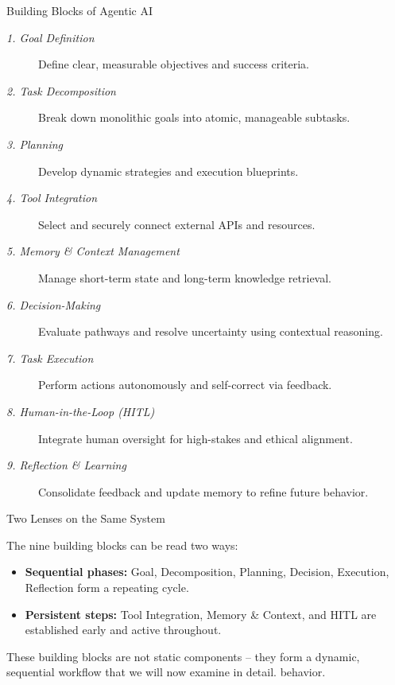 \documentclass[
11pt,notheorems,hyperref={pdfauthor=whatever}
]{beamer}
\begin{document}
\begin{frame}{Building Blocks of Agentic AI}
	\begin{description}
		\item[\textsl{1. Goal Definition}] Define clear, measurable objectives and success criteria.
		\item[\textsl{2. Task Decomposition}] Break down monolithic goals into atomic, manageable subtasks.
		\item[\textsl{3. Planning}] Develop dynamic strategies and execution blueprints.
		\item[\textsl{4. Tool Integration}] Select and securely connect external APIs and resources.
		\item[\textsl{5. Memory \& Context Management}] Manage short-term state and long-term knowledge retrieval.
		\item[\textsl{6. Decision-Making}] Evaluate pathways and resolve uncertainty using contextual reasoning.
		\item[\textsl{7. Task Execution}] Perform actions autonomously and self-correct via feedback.
		\item[\textsl{8. Human-in-the-Loop (HITL)}] Integrate human oversight for high-stakes and ethical alignment.
		\item[\textsl{9. Reflection \& Learning}] Consolidate feedback and update memory to refine future behavior.
	\end{description}
\end{frame}

\begin{frame}{Two Lenses on the Same System}
				
	The nine building blocks can be read two ways:
	\begin{itemize}
		\item \textbf{Sequential phases:} Goal, Decomposition, Planning, Decision, Execution, Reflection form a repeating cycle.
		\item \textbf{Persistent steps:} Tool Integration, Memory \& Context, and HITL are established early and active throughout.
	\end{itemize}
	
These building blocks are not static components -- they form a dynamic, sequential workflow that we will now examine in detail. behavior.
\end{frame}
\end{document}
